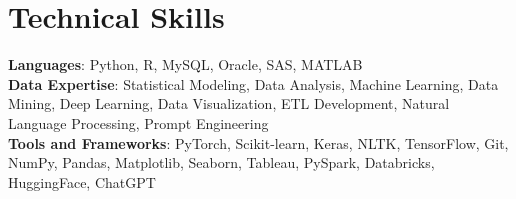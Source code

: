 \documentclass[a4paper,10.5pt]{article}
\newcommand{\resumeItem}[1]{
  \item\small{
    {#1 \vspace{-2pt}}
  }
}
\newcommand{\resumeItemListStart}{\begin{itemize}}
\newcommand{\resumeItemListEnd}{\end{itemize}\vspace{-5pt}}
\begin{document}
\section{Technical Skills}
 \begin{itemize}[leftmargin=0.0in, label={}]
    \small{\item{
     \textbf{Languages}{: Python, R, MySQL, Oracle, SAS, MATLAB} \\
     \textbf{Data Expertise}{: Statistical Modeling, Data Analysis, Machine Learning, Data Mining, Deep Learning, Data Visualization, ETL Development, Natural Language Processing, Prompt Engineering} \\
     \textbf{Tools and Frameworks}{: PyTorch, Scikit-learn, Keras, NLTK, TensorFlow, Git, NumPy, Pandas, Matplotlib, Seaborn, Tableau, PySpark, Databricks, HuggingFace, ChatGPT} \\
    }}
 \end{itemize}
 \vspace{-13pt}









    
\end{document}
